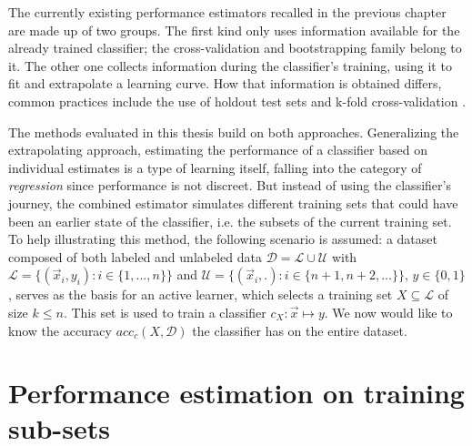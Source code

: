 \label{methods}

The currently existing performance estimators recalled in the previous chapter are made up of two groups. The first kind only uses information available for the already trained classifier; the cross-validation and bootstrapping family belong to it. The other one collects information during the classifier's training, using it to fit and extrapolate a learning curve. How that information is obtained differs, common practices include the use of holdout test sets and k-fold cross-validation \cite{FigueroaEtal2012}.

The methods evaluated in this thesis build on both approaches. Generalizing the extrapolating approach, estimating the performance of a classifier based on individual estimates is a type of learning itself, falling into the category of \textit{regression} since performance is not discreet. But instead of using the classifier's journey, the combined estimator simulates different training sets that could have been an earlier state of the classifier, i.e. the subsets of the current training set. To help illustrating this method, the following scenario is assumed: a dataset composed of both labeled and unlabeled data $\mathcal{D} = \mathcal{L} \cup \mathcal{U}$ with $\mathcal{L} = \{(\vec{x}_i, y_i) : i \in \{1, ..., n\}\}$ and $\mathcal{U} = \{(\vec{x}_i, .) : i \in \{n+1, n+2, ...\}\}$, $y \in \{0, 1\}$, serves as the basis for an active learner, which selects a training set $X \subseteq \mathcal{L}$ of size $k \leq n$. This set is used to train a classifier $c_X: \vec{x} \mapsto y$. We now would like to know the accuracy $acc_c(X, \mathcal{D})$ the classifier has on the entire dataset.

\section{Performance estimation on training sub-sets}

